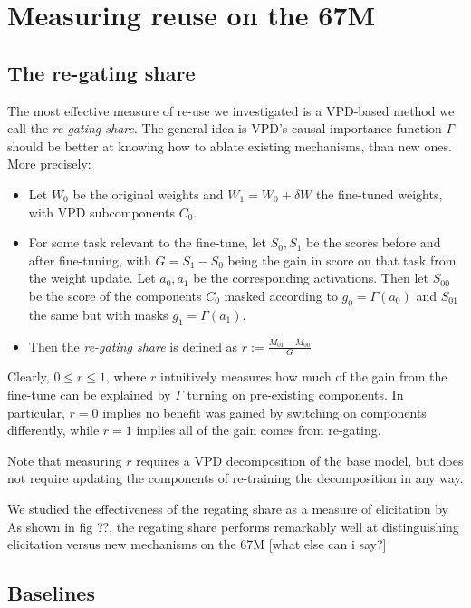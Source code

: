 \documentclass[11pt]{article}
\begin{document}
\section{Measuring reuse on the 67M}
\subsection{The re-gating share}

The most effective measure of re-use we investigated is a VPD-based method we call the \textit{re-gating share}. The general idea is VPD's causal importance function $\Gamma$ should be better at knowing how to ablate existing mechanisms, than new ones. More precisely:
\begin{itemize}
	\item Let $W_0$ be the original weights and $W_1 = W_0 + \delta W$ the fine-tuned weights, with VPD subcomponents $C_0$.
	\item For some task relevant to the fine-tune, let $S_0, S_1$ be the scores before and after fine-tuning, with $G = S_1 - S_0$ being the gain in score on that task from the weight update. Let $a_0, a_1$ be the corresponding activations. Then let $S_{00}$ be the score of the components $C_0$ masked according to $g_0 = \Gamma(a_0)$ and $S_{01}$ the same but with masks $g_1 = \Gamma(a_1)$. 
	\item Then the \textit{re-gating share} is defined as $r := \frac{M_{01} - M_{00}}{G}$
\end{itemize}

Clearly, $0 \leq r \leq 1$, where $r$ intuitively measures how much of the gain from the fine-tune can be explained by $\Gamma$ turning on pre-existing components. In particular, $r = 0$ implies no benefit was gained by switching on components differently, while $r = 1$ implies all of the gain comes from re-gating.

Note that measuring $r$ requires a VPD decomposition of the base model, but does not require updating the components of re-training the decomposition in any way.

We studied the effectiveness of the regating share as a measure of elicitation by As shown in fig ??, the regating share performs remarkably well at distinguishing elicitation versus new mechanisms on the 67M
[what else can i say?]

\subsection{Baselines}
\end{document}
